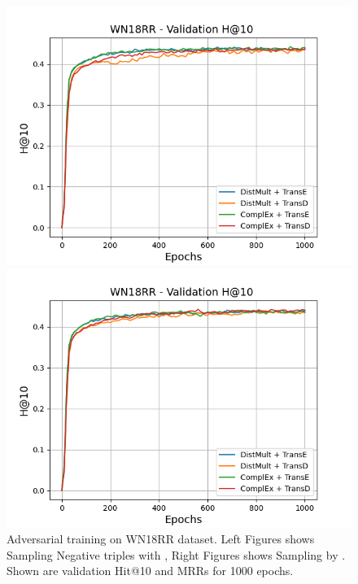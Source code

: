 \begin{figure}
\begin{minipage}{.5\textwidth}
    \end{minipage}
    \begin{minipage}{.5\textwidth}
      \centering
      \includegraphics[width=0.9\linewidth]{figures/results/gan_train/not_pretrained/uncertainty/max/entropy/wn18rr/1k_epochs/uncertainty_wn18rr_hit10.png}
    \end{minipage}%
    \begin{minipage}{.5\textwidth}
      \centering
      \includegraphics[width=0.9\linewidth]{figures/results/gan_train/not_pretrained/uncertainty/max_distribution/entropy/wn18rr/1k_epochs/uncertainty_wn18rr_hit10.png}
    \end{minipage}%
    \caption{Adversarial training on \textsc{WN18RR} dataset. 
    Left Figures shows Sampling Negative triples with \usmax, Right Figures shows Sampling by \ussoftmax.
    Shown are validation Hit@10 and MRRs for 1000 epochs.}
    \label{fig:advtrain_wn18rr_usmax_ussoftmax}
\end{figure}
